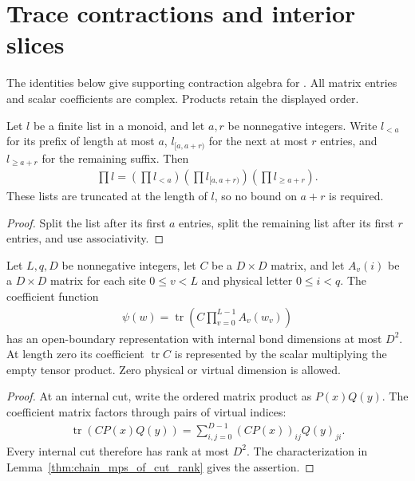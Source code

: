 \section{Trace contractions and interior slices}

The identities below give supporting contraction algebra for
\cite[Proposition~5.7]{Arad2016RigorousRG}. All matrix entries and scalar
coefficients are complex. Products retain the displayed order.

\begin{lemma}
    \label{thm:trace_core_product_partition}
    Let $l$ be a finite list in a monoid, and let $a,r$ be nonnegative
    integers. Write $l_{<a}$ for its prefix of length at most $a$,
    $l_{[a,a+r)}$ for the next at most $r$ entries, and $l_{\ge a+r}$ for
    the remaining suffix. Then
    \begin{align}
        \prod l=(\prod l_{<a})(\prod l_{[a,a+r)})(\prod l_{\ge a+r}).
        \label{eq:trace_core_product_partition}
    \end{align}
    These lists are truncated at the length of $l$, so no bound on $a+r$
    is required.
\end{lemma}
\begin{proof}\leanok
    Split the list after its first $a$ entries, split the remaining list
    after its first $r$ entries, and use associativity.
\end{proof}

\begin{lemma}
    \label{thm:trace_core_open_square}
    Let $L,q,D$ be nonnegative integers, let $C$ be a $D\times D$ matrix,
    and let $A_v(i)$ be a $D\times D$ matrix for each site $0\le v<L$
    and physical letter $0\le i<q$. The coefficient function
    \begin{align}
        \psi(w)=\operatorname{tr}\left(C\prod_{v=0}^{L-1}A_v(w_v)\right)
        \label{eq:trace_core_closed_coefficient}
    \end{align}
    has an open-boundary representation with internal bond dimensions at
    most $D^2$. At length zero its coefficient $\operatorname{tr}C$ is
    represented by the scalar multiplying the empty tensor product.
    Zero physical or virtual dimension is allowed.
\end{lemma}
\begin{proof}\leanok
    At an internal cut, write the ordered matrix product as $P(x)Q(y)$.
    The coefficient matrix factors through pairs of virtual indices:
    \begin{align}
        \operatorname{tr}(CP(x)Q(y))
        =\sum_{i,j=0}^{D-1}(CP(x))_{ij}Q(y)_{ji}.
        \label{eq:trace_core_cut_factorization}
    \end{align}
    Every internal cut therefore has rank at most $D^2$. The
    characterization in Lemma~\ref{thm:chain_mps_of_cut_rank} gives
    the assertion.
\end{proof}

